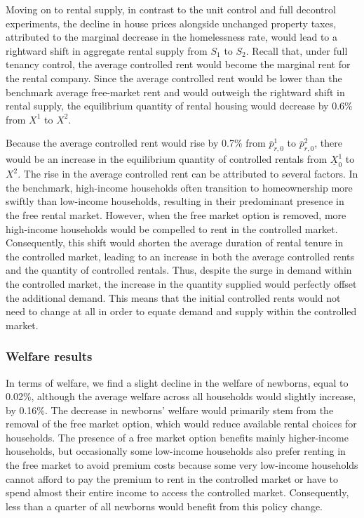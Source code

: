 \documentclass[parskip=full]{article}
\begin{document}
Moving on to rental supply, in contrast to the unit control and full decontrol experiments, the decline in house prices alongside unchanged property taxes, attributed to the marginal decrease in the homelessness rate, would lead to a rightward shift in aggregate rental supply from $S_{1}$ to $S_{2}$. Recall that, under full tenancy control, the average controlled rent would become the marginal rent for the rental company. Since the average controlled rent would be lower than the benchmark average free-market rent and would outweigh the rightward shift in rental supply, the equilibrium quantity of rental housing would decrease by 0.6\% from $X^{1}$ to $X^{2}$.

Because the average controlled rent would rise by 0.7\% from $\overline{p}^{1}_{r,0}$ to $\overline{p}^{2}_{r,0}$, there would be an increase in the equilibrium quantity of controlled rentals from $\underline{X}^{1}_{0}$ to $X^{2}$. The rise in the average controlled rent can be attributed to several factors. In the benchmark, high-income households often transition to homeownership more swiftly than low-income households, resulting in their predominant presence in the free rental market. However, when the free market option is removed, more high-income households would be compelled to rent in the controlled market. Consequently, this shift would shorten the average duration of rental tenure in the controlled market, leading to an increase in both the average controlled rents and the quantity of controlled rentals. Thus, despite the surge in demand within the controlled market, the increase in the quantity supplied would perfectly offset the additional demand. This means that the initial controlled rents would not need to change at all in order to equate demand and supply within the controlled market. 

\subsubsection{Welfare results}

In terms of welfare, we find a slight decline in the welfare of newborns, equal to 0.02\%, although the average welfare across all households would slightly increase, by 0.16\%. The decrease in newborns' welfare would primarily stem from the removal of the free market option, which would reduce available rental choices for households. The presence of a free market option benefits mainly higher-income households, but occasionally some low-income households also prefer renting in the free market to avoid premium costs because some very low-income households cannot afford to pay the premium to rent in the controlled market or have to spend almost their entire income to access the controlled market. Consequently, less than a quarter of all newborns would benefit from this policy change.
\end{document}
